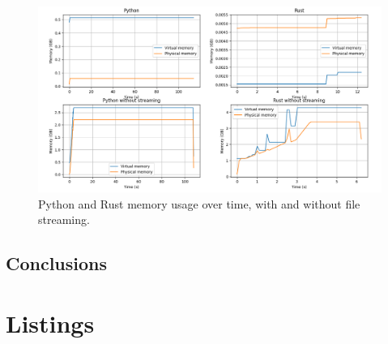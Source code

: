 \documentclass{article}
\begin{document}
\begin{figure}[H]
    \centering
    \includegraphics[width=1\textwidth]{figures/baseline.png}
    \caption{Python and Rust memory usage over time, with and without file streaming.}
    \label{fig:baseline}
\end{figure}
\begin{multicols}{2}

\section{Conclusions}
\end{multicols}
\section{Listings}








\end{document}
